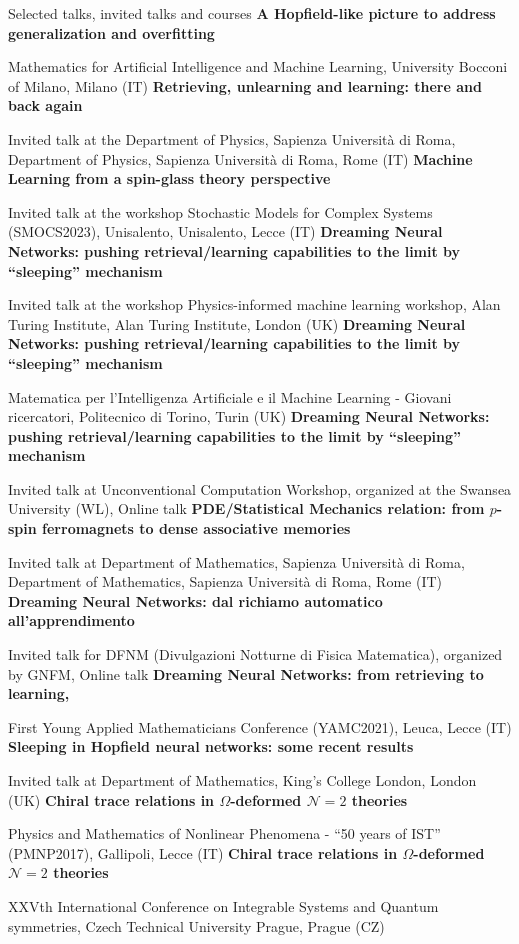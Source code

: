 \begin{rubric}{Selected talks, invited talks and courses}
\entry*[Jan 2024]
  \textbf{A Hopfield-like picture to address generalization and overfitting}\par Mathematics for Artificial Intelligence and Machine Learning, University Bocconi of Milano, Milano (IT)
\entry*[May 2023]
  \textbf{Retrieving, unlearning and learning: there and back again}\par Invited talk at the Department of Physics, Sapienza Università di Roma, Department of Physics, Sapienza Università di Roma, Rome (IT)
\entry*[May 2023]
  \textbf{Machine Learning from a spin-glass theory perspective}\par Invited talk at the workshop Stochastic Models for Complex Systems (SMOCS2023), Unisalento, Unisalento, Lecce (IT)
\entry*[Jan 2023]
  \textbf{Dreaming Neural Networks: pushing retrieval/learning capabilities to the limit by ``sleeping'' mechanism}\par Invited talk at the workshop Physics-informed machine learning workshop, Alan Turing Institute, Alan Turing Institute, London (UK)
\entry*[Nov 2022]
  \textbf{Dreaming Neural Networks: pushing retrieval/learning capabilities to the limit by ``sleeping'' mechanism}\par Matematica per l'Intelligenza Artificiale e il Machine Learning - Giovani ricercatori, Politecnico di Torino, Turin (UK)
\entry*[Jul 2022]
  \textbf{Dreaming Neural Networks: pushing retrieval/learning capabilities to the limit by ``sleeping'' mechanism}\par Invited talk at Unconventional Computation Workshop, organized at the Swansea University (WL), Online talk
\entry*[Jun 2022]
  \textbf{PDE/Statistical Mechanics relation: from $p$-spin ferromagnets to dense associative memories}\par Invited talk at Department of Mathematics, Sapienza Università di Roma, Department of Mathematics, Sapienza Università di Roma, Rome (IT)
\entry*[Nov 2021]
  \textbf{Dreaming Neural Networks: dal richiamo automatico all'apprendimento}\par Invited talk for DFNM (Divulgazioni Notturne di Fisica Matematica), organized by GNFM, Online talk
\entry*[Sep 2021]
  \textbf{Dreaming Neural Networks: from retrieving to learning,}\par First Young Applied Mathematicians Conference (YAMC2021), Leuca, Lecce (IT)
\entry*[Oct 2018]
  \textbf{Sleeping in Hopfield neural networks: some recent results}\par Invited talk at Department of Mathematics, King's College London, London (UK)
\entry*[Jun 2017]
  \textbf{Chiral trace relations in $\Omega$-deformed $\mathcal N=2$ theories}\par Physics and Mathematics of Nonlinear Phenomena - “50 years of IST” (PMNP2017), Gallipoli, Lecce (IT)
\entry*[Jun 2017]
  \textbf{Chiral trace relations in $\Omega$-deformed $\mathcal N=2$ theories}\par XXVth International Conference on Integrable Systems and Quantum symmetries, Czech Technical University Prague, Prague (CZ)
\end{rubric}
